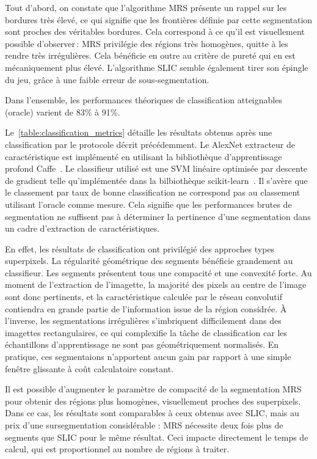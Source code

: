 Tout d'abord, on constate que l'algorithme \gls{MRS} présente un rappel sur les bordures très élevé, ce qui signifie que les frontières définie par cette segmentation sont proches des véritables bordures. Cela correspond à ce qu'il est visuellement possible d'observer\,: \gls{MRS} privilégie des régions très homogènes, quitte à les rendre très irrégulières. Cela bénéficie en outre au critère de pureté qui en est mécaniquement plus élevé. L'algorithme \gls{SLIC} semble également tirer son épingle du jeu, grâce à une faible erreur de sous-segmentation.

Dans l'ensemble, les performances théoriques de classification atteignables (oracle) varient de 83\% à 91\%.

Le~\cref{table:classification_metrics} détaille les résultats obtenus après une classification par le protocole décrit précédemment. Le AlexNet extracteur de caractéristique est implémenté en utilisant la bibliothèque d'apprentissage profond Caffe~\cite{jia_caffe_2014}. Le classifieur utilisé est une \gls{SVM} linéaire optimisée par descente de gradient telle qu'implémentée dans la bilbiothèque scikit-learn~\cite{pedregosa_scikit-learn_2011}.
Il s'avère que le classement par taux de bonne classification ne correspond pas au classement utilisant l'oracle comme mesure. Cela signifie que les performances brutes de segmentation ne suffisent pas à déterminer la pertinence d'une segmentation dans un cadre d'extraction de caractéristiques.

En effet, les résultats de classification ont privilégié des approches types superpixels. La régularité géométrique des segments bénéficie grandement au classifieur. Les segments présentent tous une compacité et une convexité forte. Au moment de l'extraction de l'imagette, la majorité des pixels au centre de l'image sont donc pertinents, et la caractéristique calculée par le réseau convolutif contiendra en grande partie de l'information issue de la région considrée. À l'inverse, les segmentations irrégulières s'imbriquent difficilement dans des imagettes rectangulaires, ce qui complexifie la tâche de classification car les échantillons d'apprentissage ne sont pas géométriquement normalisés. En pratique, ces segmentaions n'apportent aucun gain par rapport à une simple fenêtre glissante à coût calculatoire constant.

Il est possible d'augmenter le paramètre de compacité de la segmentation \gls{MRS} pour obtenir des régions plus homogènes, visuellement proches des superpixels. Dans ce cas, les résultats sont comparables à ceux obtenus avec \gls{SLIC}, mais au prix d'une sursegmentation considérable : \gls{MRS} nécessite deux fois plus de segments que \gls{SLIC} pour le même résultat. Ceci impacte directement le temps de calcul, qui est proportionnel au nombre de régions à traiter.

